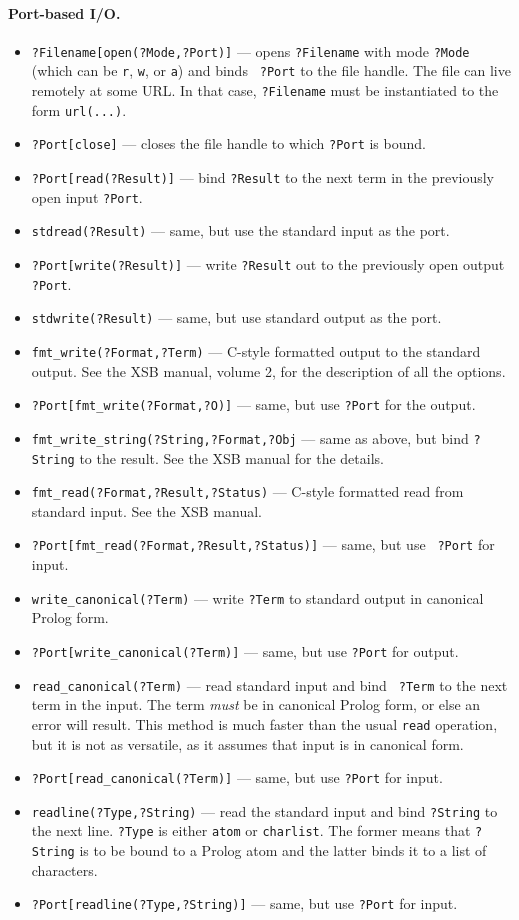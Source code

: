 \documentclass[11pt]{article}
\begin{document}
\paragraph{Port-based I/O.}
\begin{itemize}
\item  {\tt ?Filename[open(?Mode,?Port)]} --- opens {\tt ?Filename} with mode
  {\tt ?Mode} (which can be {\tt r}, {\tt w}, or {\tt a}) and binds {\tt
  ?Port} to the file handle.
  The file can live remotely at some URL. In that case, {\tt ?Filename}
  must be instantiated to the form {\tt url(...)}.  
\item {\tt ?Port[close]} --- closes the file handle to which {\tt ?Port} is
  bound.
\item {\tt ?Port[read(?Result)]} --- bind {\tt ?Result} to the next term
  in the previously open input {\tt ?Port}.
\item {\tt stdread(?Result)} --- same, but use the standard input as the port.
\item {\tt ?Port[write(?Result)]} --- write {\tt ?Result} out to the
  previously open output {\tt ?Port}.
\item {\tt stdwrite(?Result)} --- same, but use standard output as the port.
\item {\tt fmt\_write(?Format,?Term)} --- C-style formatted output to the
  standard output. See the XSB manual, volume 2, for the description of all
  the options.
\item {\tt ?Port[fmt\_write(?Format,?O)]} --- same, but use {\tt ?Port} for the
  output. 
\item {\tt fmt\_write\_string(?String,?Format,?Obj} --- same as above, but bind
  {\tt ?String} to the result. See the XSB manual for the details.
\item {\tt fmt\_read(?Format,?Result,?Status)} --- C-style formatted read from
  standard input. See the XSB manual.
\item {\tt ?Port[fmt\_read(?Format,?Result,?Status)]}  ---  same, but use {\tt
    ?Port} for input.
\item {\tt write\_canonical(?Term)} --- write {\tt ?Term} to standard output
  in canonical Prolog form.
\item {\tt ?Port[write\_canonical(?Term)]} --- same, but use {\tt ?Port} for
  output.
\item {\tt read\_canonical(?Term)} --- read standard input and bind {\tt
    ?Term} to the next term in the input. The term \emph{must} be in
  canonical Prolog form, or else an error will result. This method is much
  faster than the usual {\tt read} operation, but it is not as versatile,
  as it assumes that input is in canonical form.
\item {\tt ?Port[read\_canonical(?Term)]} --- same, but use {\tt ?Port} for
  input.
\item {\tt readline(?Type,?String)} --- read the standard input and bind
  {\tt ?String} to the next line. {\tt ?Type} is either {\tt atom} or
  {\tt charlist}. The former means that {\tt ?String} is to be bound to a
  Prolog atom and the latter binds it to a list of characters.
\item {\tt ?Port[readline(?Type,?String)]} --- same, but use {\tt ?Port} for
  input.
\end{itemize}
\end{document}
